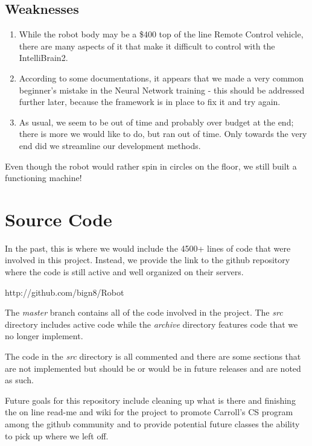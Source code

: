 \documentclass[12pt]{article}
\begin{document}
\subsection{Weaknesses}
\begin{enumerate}
\item While the robot body may be a \$400 top of the line Remote Control vehicle, there are many aspects of it that make it difficult to control with the IntelliBrain2.
\item According to some documentations, it appears that we made a very common beginner's mistake in the Neural Network training - this should be addressed further later, because the framework is in place to fix it and try again.
\item As usual, we seem to be out of time and probably over budget at the end; there is more we would like to do, but ran out of time.  Only towards the very end did we streamline our development methods.
\end{enumerate}

Even though the robot would rather spin in circles on the floor, we still built a functioning machine!

\clearpage
\section{Source Code}
In the past, this is where we would include the 4500+ lines of code that were involved in this project.  Instead, we provide the link to the github repository where the code is still active and well organized on their servers.\\
\centerline{{\color{blue}http://github.com/bign8/Robot}}
\vspace{2mm}

The \textit{master} branch contains all of the code involved in the project.  The \textit{src} directory includes active code while the \textit{archive} directory features code that we no longer implement.

The code in the \textit{src} directory is all commented and there are some sections that are not implemented but should be or would be in future releases and are noted as such.
\vspace{2mm}

Future goals for this repository include cleaning up what is there and finishing the on line read-me and wiki for the project to promote Carroll's CS program among the github community and to provide potential future classes the ability to pick up where we left off.
\end{document}
